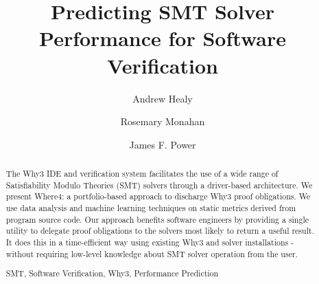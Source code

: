 \documentclass[runningheads,a4paper]{llncs}
\newcommand{\keywords}[1]{\par\addvspace\baselineskip
\noindent\keywordname\enspace\ignorespaces#1}
\begin{document}
\mainmatter  %

\title{Predicting SMT Solver Performance for Software Verification}


%
%
\author{Andrew Healy 
\and Rosemary Monahan \and James F. Power}
%


%
%

\maketitle


\begin{abstract}
The \textsf{Why3} IDE and verification system facilitates the use of a wide range of Satisfiability Modulo Theories (SMT) solvers through a driver-based architecture. We present \textsf{Where4}: a portfolio-based approach to discharge \textsf{Why3} proof obligations. We use data analysis and machine learning techniques on static metrics derived from program source code. Our approach benefits software engineers by providing a single utility to delegate proof obligations to the solvers most likely to return a useful result. It does this in a time-efficient way using existing \textsf{Why3} and solver installations - without requiring low-level knowledge about SMT solver operation from the user.
\keywords{SMT, Software Verification, \textsf{Why3}, Performance Prediction}
\end{abstract}
\end{document}
